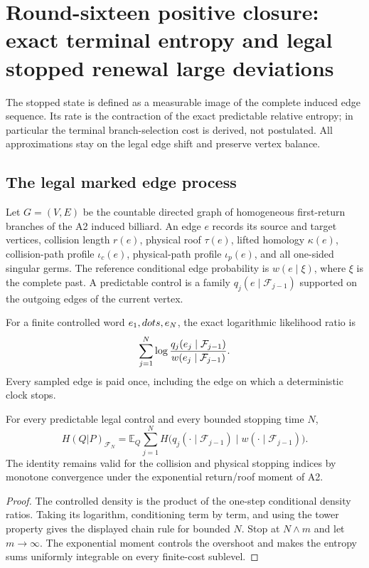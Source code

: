 \section{Round-sixteen positive closure: exact terminal entropy and legal stopped renewal large deviations}
\label{sec:r16-a3}

The stopped state is defined as a measurable image of the complete induced
edge sequence.  Its rate is the contraction of the exact predictable relative
entropy; in particular the terminal branch-selection cost is derived, not
postulated.  All approximations stay on the legal edge shift and preserve
vertex balance.

\subsection{The legal marked edge process}

Let \(G=(V,E)\) be the countable directed graph of homogeneous first-return
branches of the A2 induced billiard.  An edge \(e\) records its source and
target vertices, collision length \(r(e)\), physical roof \(\tau(e)\), lifted
homology \(\kappa(e)\), collision-path profile \(\iota_c(e)\), physical-path
profile \(\iota_p(e)\), and all one-sided singular germs.  The reference
conditional edge probability is \(w(e\mid\xi)\), where \(\xi\) is the complete
past.  A predictable control is a family
\(q_j(e\mid\mathcal F_{j-1})\) supported on the outgoing edges of the current
vertex.

For a finite controlled word \(e_1,\\dots,e_N\), the exact logarithmic
likelihood ratio is
\[
 \sum_{j=1}^N
 \log {q_j(e_j\mid\mathcal F_{j-1})
       \over w(e_j\mid\mathcal F_{j-1})}.
\]
Every sampled edge is paid once, including the edge on which a deterministic
clock stops.

\begin{theorem}
\label{thm:r16-a3-entropy}
For every predictable legal control and every bounded stopping time \(N\),
\[
 H(Q|P)_{\mathcal F_N}
 =\mathbb E_Q\sum_{j=1}^{N}
 H\bigl(q_j(\cdot\mid\mathcal F_{j-1})
       \mid w(\cdot\mid\mathcal F_{j-1})\bigr).
\]
The identity remains valid for the collision and physical stopping indices by
monotone convergence under the exponential return/roof moment of A2.
\end{theorem}

\begin{proof}
The controlled density is the product of the one-step conditional density
ratios.  Taking its logarithm, conditioning term by term, and using the tower
property gives the displayed chain rule for bounded \(N\).  Stop at
\(N\wedge m\) and let \(m\to\infty\).  The exponential moment controls the
overshoot and makes the entropy sums uniformly integrable on every finite-cost
sublevel.
\end{proof}

